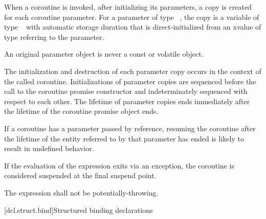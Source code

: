 \pnum
When a coroutine is invoked,
after initializing its parameters,
a copy is created for each coroutine parameter.
For a parameter of type \cv{}~,
the copy is a variable of type \cv{}~
with automatic storage duration that is direct-initialized
from an xvalue of type  referring to the parameter.
\begin{note}
An original parameter object is never
a const or volatile object.
\end{note}
The initialization and destruction of each parameter copy occurs in the
context of the called coroutine.
Initializations of parameter copies are sequenced before the call to the
coroutine promise constructor and indeterminately sequenced with respect to
each other.
The lifetime of parameter copies ends immediately after the lifetime of the
coroutine promise object ends.
\begin{note}
If a coroutine has a parameter passed by reference, resuming the coroutine
after the lifetime of the entity referred to by that parameter has ended is
likely to result in undefined behavior.
\end{note}

\pnum
If the evaluation of the expression
 exits via an exception,
the coroutine is considered suspended at the final suspend point.

\pnum
The expression  
shall not be potentially-throwing.

[dcl.struct.bind]{Structured binding declarations}%
%
%

